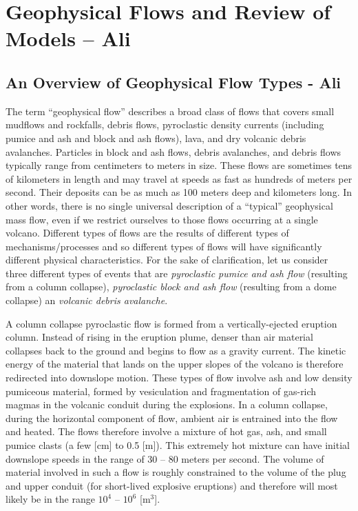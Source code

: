 \documentclass{article}
\begin{document}
\section{Geophysical Flows and Review of Models -- Ali}\label{sec:GeoPhFlows}

\subsection{An Overview of Geophysical Flow Types - Ali}\label{subsec:FlowTypes}
The term ``geophysical flow'' describes a broad class of flows that covers small mudflows and rockfalls, debris flows, pyroclastic density currents (including pumice and ash and block and ash flows), lava, and dry volcanic debris avalanches. Particles in block and ash flows, debris avalanches, and debris flows typically range from centimeters to meters in size. These flows are sometimes tens of kilometers in length and may travel at speeds as fast as hundreds of meters per second. Their deposits can be as much as 100 meters deep and kilometers long. In other words, there is no single universal description of a ``typical'' geophysical mass flow, even if we restrict ourselves to those flows occurring at a single volcano. Different types of flows are the results of different types of mechanisms/processes and so different types of flows will have significantly different physical characteristics. For the sake of clarification, let us consider three different types of events that are \textit{pyroclastic pumice and ash flow} (resulting from a column collapse), \textit{pyroclastic block and ash flow} (resulting from a dome collapse) an \textit{volcanic debris avalanche}.

A column collapse pyroclastic flow is formed from a vertically-ejected eruption column. Instead of rising in the eruption plume, denser than air material collapses back to the ground and begins to flow as a gravity current. The kinetic energy of the material that lands on the upper slopes of the volcano is therefore redirected into downslope motion. These types of flow involve ash and low density pumiceous material, formed by vesiculation and fragmentation of gas-rich magmas in the volcanic conduit during the explosions. In a column collapse, during the horizontal component of flow, ambient air is entrained into the flow and heated. The flows therefore involve a mixture of hot gas, ash, and small pumice clasts (a few [cm] to 0.5 [m]). This extremely hot mixture can have initial downslope speeds in the range of 30 -- 80 meters per second. The volume of material involved in such a flow is roughly constrained to the volume of the plug and upper conduit (for short-lived explosive eruptions) and therefore will most likely be in the range $10^4$ -- $10^6$ [$\mathrm{m^3}$].
\end{document}
